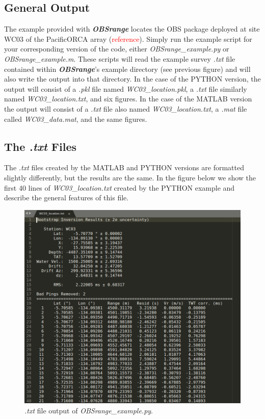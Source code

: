 \documentclass[titlepage]{article}
\begin{document}
  \subsection{General Output}
  The example provided with \textbf{\textit{OBSrange}} locates the OBS package deployed at site WC03 of the PacificORCA array (\textcolor{red}{reference}). Simply run the example script for your corresponding version of the code, either \textit{OBSrange\_example.py} or \textit{OBSrange\_example.m}. These scripts will read the example survey \textit{.txt} file contained within \textbf{\textit{OBSrange}}’s  example directory (see previous figure) and will also write the output into that directory.  In the case of the PYTHON version, the output will consist of a \textit{.pkl} file named \textit{WC03\_location.pkl}, a \textit{.txt} file similarly named \textit{WC03\_location.txt}, and six figures. In the case of the MATLAB version the output will consist of a \textit{.txt} file also named \textit{WC03\_location.txt}, a \textit{.mat} file called \textit{WC03\_data.mat}, and the same figures.

  \subsection{The \textit{.txt} Files}
  The \textit{.txt} files created by the MATLAB and PYTHON versions are formatted slightly differently, but the results are the same. In the figure below we show the first 40 lines of \textit{WC03\_location.txt} created by the PYTHON example and describe the general features of this file.\\

  \begin{figure}[h]
   \includegraphics[width=\linewidth]{example_txt_fle.png}
   \caption{\textit{.txt} file output of \textit{OBSrange\_example.py}.}
  \end{figure}
\end{document}
